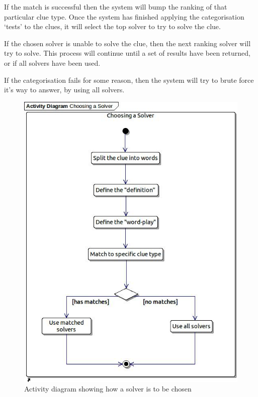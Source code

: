 If the match is successful then the system will bump the ranking of that 
particular clue type. Once the system has finished applying the categorisation 
`tests' to the clues, it will select the top solver to try to solve the clue.

If the chosen solver is unable to solve the clue, then the next ranking solver 
will try to solve. This process will continue until a set of results have been 
returned, or if all solvers have been used.

If the categorisation fails for some reason, then the system will try to brute 
force it's way to answer, by using all solvers.

\begin{figure}[H]
  \centering
  \includegraphics[scale=0.6]{activity/choosing_a_solver.jpg}
  \caption{Activity diagram showing how a solver is to be chosen}
  \label{fig:categorisation_activity}
\end{figure}


